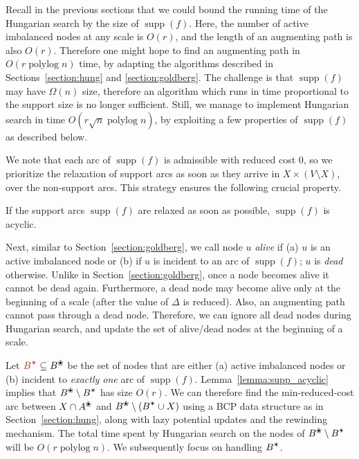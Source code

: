 \documentclass[a4paper,UKenglish]{socg-lipics-v2019}
\makeatletter
\def\polylog{\mathop{\mathrm{polylog}}}
\def\supp{\operatorname{supp}}
\def\alive#1{{#1}^\text{\ding{96}}}
\def\star{\text{\ding{84}}}
\theoremstyle{plain}
\numberwithin{figure}{section}
\def\EMPH#1{\textcolor{BrickRed}{{\emph{#1}}}}
\def\n@te#1{\textsf{\boldmath \textbf{$\langle\!\langle$#1$\rangle\!\rangle$}}\leavevmode}
\def\note#1{\textcolor{red}{\n@te{#1}}}
\makeatother
\begin{document}
Recall in the previous sections that we could bound the running time of the
Hungarian search by the size of $\supp(f)$.
Here, the number of active imbalanced nodes at any scale is $O(r)$, and the
length of an augmenting path is also $O(r)$.
Therefore one might hope to find an augmenting path in $O(r\polylog n)$ time,
by adapting the algorithms described in Sections~\ref{section:hung} and
\ref{section:goldberg}.
The challenge is that $\supp(f)$ may have $\Omega(n)$ size,
therefore an algorithm which runs in time proportional to the support size is no longer
sufficient.
Still, we manage to implement Hungarian search in time $O(r\sqrt{n}\polylog n)$,
by exploiting a few properties of $\supp(f)$ as described below.

We note that each arc of $\supp(f)$ is admissible with reduced cost $0$,
so we prioritize the relaxation of support arcs as soon as they arrive in
$X \times (V \setminus X)$, over the non-support arcs.
This strategy ensures the following crucial property.

\begin{lemma}
\label{lemma:supp_acyclic}
If the support arcs $\supp(f)$ are relaxed as soon as possible, $\supp(f)$ is acyclic.
\end{lemma}

Next, similar to Section~\ref{section:goldberg}, we call node $u$
\EMPH{alive} if (a) $u$ is an active imbalanced node or (b) if $u$ is incident to
an arc of $\supp(f)$; $u$ is \EMPH{dead} otherwise.
Unlike in Section~\ref{section:goldberg}, once a node becomes alive it cannot
be dead again.
Furthermore, a dead node may become alive only at the beginning of a scale
(after the value of $\Delta$ is reduced).
Also, an augmenting path cannot pass through a dead node.
Therefore, we can ignore all dead nodes during Hungarian search,
and update the set of alive/dead nodes at the beginning of a scale.

Let $\EMPH{$B^\star$} \subseteq \alive{B}$ be the set of nodes that are either (a) active
imbalanced nodes or (b) incident to \emph{exactly one} arc of $\supp(f)$.
Lemma~\ref{lemma:supp_acyclic} implies that $\alive{B} \setminus B^\star$ has size $O(r)$.
%
We can therefore find the min-reduced-cost arc between $X \cap \alive{A}$ and $\alive{B} \setminus (B^\star \cup X)$
using a BCP data structure as in Section~\ref{section:hung}, along with lazy
potential updates and the rewinding mechanism.
The total time spent by Hungarian search on the nodes of $\alive{B} \setminus B^\star$ will be $O(r\polylog n)$.
We subsequently focus on handling $B^\star$.
\end{document}
